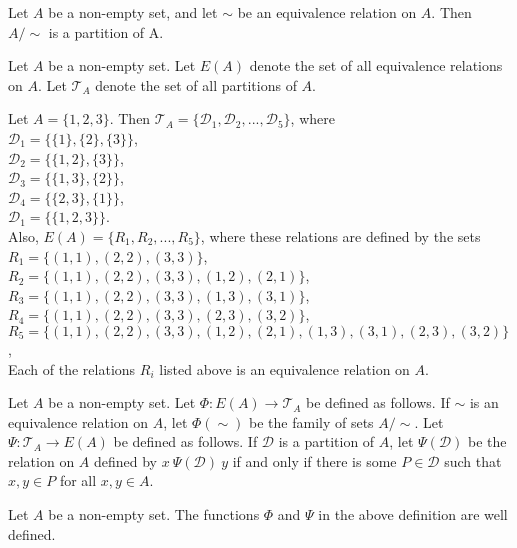 \documentclass[a4paper,english,12pt]{article}
\begin{document}
\begin{cor} 
	Let $A$ be a non-empty set, and let $\sim$ be an equivalence relation on $A$. Then $A/\sim$ is a partition of A.
\end{cor}

\begin{defn} 
	Let $A$ be a non-empty set. Let $E(A)$ denote the set of all equivalence relations on $A$. Let $\mathcal{T}_A$ denote the set of all partitions of $A$.
\end{defn}

\begin{exmp}
	Let $A=\{1,2,3\}$. Then $\mathcal{T}_A = \{\mathcal{D}_1, \mathcal{D}_2,...,\mathcal{D}_5\}$, where\\
	$\mathcal{D}_1 = \{\{1\},\{2\},\{3\}\}$,\\
	$\mathcal{D}_2 = \{\{1,2\},\{3\}\}$,\\
	$\mathcal{D}_3 = \{\{1,3\},\{2\}\}$,\\
	$\mathcal{D}_4 = \{\{2,3\},\{1\}\}$,\\
	$\mathcal{D}_1 = \{\{1,2,3\}\}$.\\
	
	Also, $E(A) = \{R_1, R_2,..., R_5\}$, where these relations are defined by the sets\\
	$R_1 = \{(1,1),(2,2),(3,3)\}$,\\
	$R_2 = \{(1,1),(2,2),(3,3),(1,2),(2,1)\}$,\\
	$R_3 = \{(1,1),(2,2),(3,3),(1,3),(3,1)\}$,\\
	$R_4 = \{(1,1),(2,2),(3,3),(2,3),(3,2)\}$,\\
	$R_5 = \{(1,1),(2,2),(3,3),(1,2),(2,1),(1,3),(3,1),(2,3),(3,2)\}$,\\
	
	Each of the relations $R_i$ listed above is an equivalence relation on $A$.
\end{exmp}

\begin{defn}
	Let $A$ be a non-empty set. Let $\Phi : E(A) \rightarrow \mathcal{T}_A$ be defined as follows. If $\sim$ is an equivalence relation on $A$, let $\Phi(\sim)$ be the family of sets $A/\sim$. Let $\Psi : \mathcal{T}_A \rightarrow E(A)$ be defined as follows. If $\mathcal{D}$ is a partition of $A$, let $\Psi(\mathcal{D})$ be the relation on $A$ defined by $x \: \Psi(\mathcal{D}) \: y$ if and only if there is some $P \in \mathcal{D}$ such that $x,y \in P$ for all $x,y \in A$.
\end{defn}

\begin{lem}
	Let $A$ be a non-empty set. The functions $\Phi$ and $\Psi$ in the above definition are well defined.
\end{lem}
	
\end{document}
